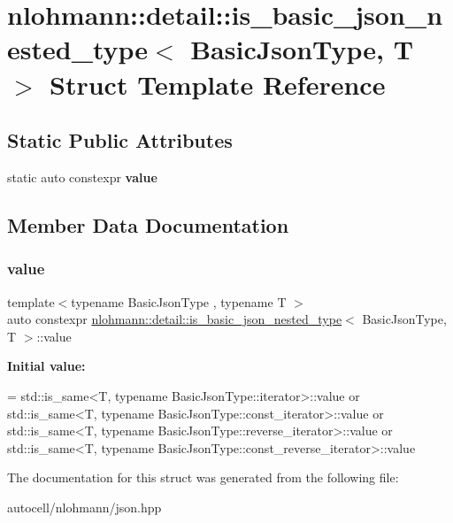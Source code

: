 \hypertarget{structnlohmann_1_1detail_1_1is__basic__json__nested__type}{}\section{nlohmann\+:\+:detail\+:\+:is\+\_\+basic\+\_\+json\+\_\+nested\+\_\+type$<$ Basic\+Json\+Type, T $>$ Struct Template Reference}
\label{structnlohmann_1_1detail_1_1is__basic__json__nested__type}
\subsection*{Static Public Attributes}
\begin{DoxyCompactItemize}
\item 
static auto constexpr {\bfseries value}
\end{DoxyCompactItemize}


\subsection{Member Data Documentation}
\mbox{\label{structnlohmann_1_1detail_1_1is__basic__json__nested__type_aee5fee744e5298a78d557f2ee5f090db}} 
\subsubsection{\texorpdfstring{value}{value}}
{\footnotesize\ttfamily template$<$typename Basic\+Json\+Type , typename T $>$ \\
auto constexpr \mbox{\hyperlink{structnlohmann_1_1detail_1_1is__basic__json__nested__type}{nlohmann\+::detail\+::is\+\_\+basic\+\_\+json\+\_\+nested\+\_\+type}}$<$ Basic\+Json\+Type, T $>$\+::value\hspace{0.3cm}{\ttfamily [static]}}

{\bfseries Initial value\+:}
\begin{DoxyCode}
= std::is\_same<T, typename BasicJsonType::iterator>::value or
                                  std::is\_same<T, typename BasicJsonType::const\_iterator>::value or
                                  std::is\_same<T, typename BasicJsonType::reverse\_iterator>::value or
                                  std::is\_same<T, typename BasicJsonType::const\_reverse\_iterator>::value
\end{DoxyCode}


The documentation for this struct was generated from the following file\+:\begin{DoxyCompactItemize}
\item 
autocell/nlohmann/json.\+hpp\end{DoxyCompactItemize}
